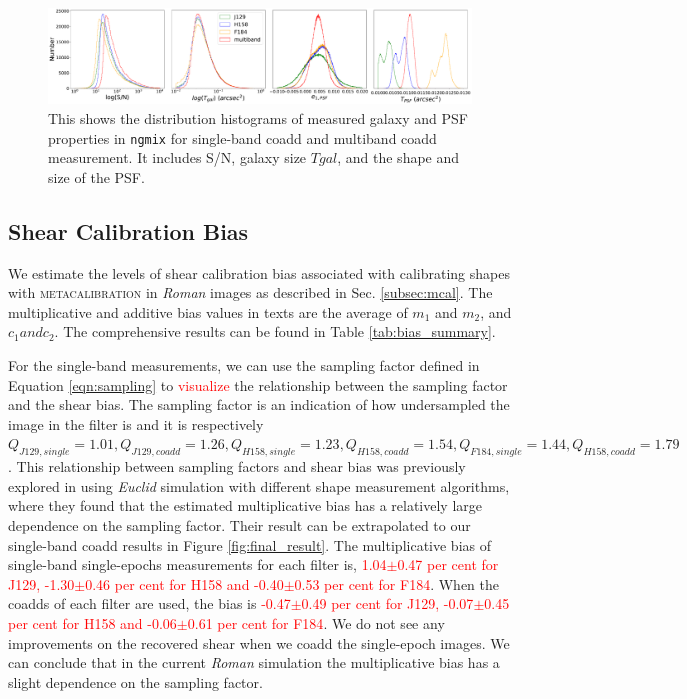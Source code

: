 {\begin{figure}
    \hspace*{-3.0cm}
    \centering
	\includegraphics[scale=0.34]{ngmix_snr_T.pdf}
    \caption{This shows the distribution histograms of measured galaxy and PSF properties in \texttt{ngmix} for single-band coadd and multiband coadd measurement. It includes S/N, galaxy size $T{gal}$, and the shape and size of the PSF.}
    \label{fig:measured_properties}
\end{figure}


\subsection{Shear Calibration Bias}
\label{subsec:shapes}
We estimate the levels of shear calibration bias associated with calibrating shapes with \textsc{metacalibration} in \emph{Roman} images as described in Sec. \ref{subsec:mcal}. The multiplicative and additive bias values in texts are the average of $m_{1}$ and $m_{2}$, and $c_{1} and c_{2}$. The comprehensive results can be found in Table \ref{tab:bias_summary}.  

For the single-band measurements, we can use the sampling factor defined in Equation \ref{eqn:sampling} to \textcolor{red}{visualize} the relationship between the sampling factor and the shear bias. The sampling factor is an indication of how undersampled the image in the filter is and it is respectively $Q_{J129,single}=1.01, Q_{J129,coadd}=1.26, Q_{H158,single}=1.23, Q_{H158,coadd}=1.54, Q_{F184,single}=1.44, Q_{H158,coadd}=1.79$. This relationship between sampling factors and shear bias was previously explored in \citealt{2021MNRAS.502.4048K} using \emph{Euclid} simulation with different shape measurement algorithms, where they found that the estimated multiplicative bias has a relatively large dependence on the sampling factor. Their result can be extrapolated to our single-band coadd results in Figure \ref{fig:final_result}. The multiplicative bias of single-band single-epochs measurements for each filter is, \textcolor{red}{1.04$\pm$0.47 per cent for J129, -1.30$\pm$0.46 per cent for H158 and -0.40$\pm$0.53 per cent for F184}. When the coadds of each filter are used, the bias is \textcolor{red}{-0.47$\pm$0.49 per cent for J129, -0.07$\pm$0.45 per cent for H158 and -0.06$\pm$0.61 per cent for F184}. We do not see any improvements on the recovered shear when we coadd the single-epoch images. We can conclude that in the current \emph{Roman} simulation the multiplicative bias has a slight dependence on the sampling factor.


}
